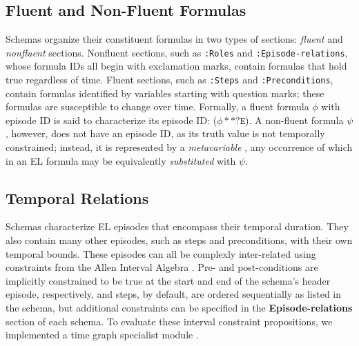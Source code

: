 \subsection{Fluent and Non-Fluent Formulas}
Schemas organize their constituent formulas in two types of sections: \textit{fluent} and \textit{nonfluent} sections. Nonfluent sections, such as \texttt{:Roles} and \texttt{:Episode-relations}, whose formula IDs all begin with exclamation marks, contain formulas that hold true regardless of time. Fluent sections, such as \texttt{:Steps} and \texttt{:Preconditions}, contain formulas identified by variables starting with question marks; these formulas are susceptible to change over time. Formally, a fluent formula $\phi$ with episode ID  is said to characterize its episode ID: ($\phi ** \texttt{?E}$). A non-fluent formula $\psi$, however, does not have an episode ID, as its truth value is not temporally constrained; instead, it is represented by a \textit{metavariable} , any occurrence of which in an EL formula may be equivalently \textit{substituted} with $\psi$.

\subsection{Temporal Relations}
Schemas characterize EL episodes that encompass their temporal duration. They also contain many other episodes, such as steps and preconditions, with their own temporal bounds. These episodes can all be complexly inter-related using constraints from the Allen Interval Algebra \citep{allen1983maintaining}. Pre- and post-conditions are implicitly constrained to be true at the start and end of the schema's header episode, respectively, and steps, by default, are ordered sequentially as listed in the schema, but additional constraints can be specified in the \textbf{Episode-relations} section of each schema. To evaluate these interval constraint propositions, we implemented a time graph specialist module \citep{gerevini1993efficient}.
